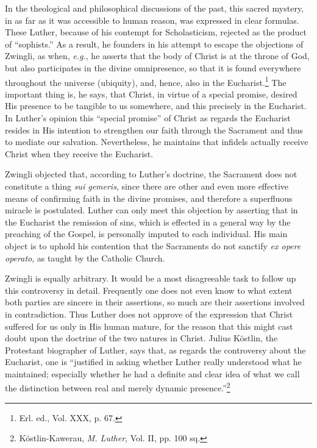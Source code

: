 In the theological and philosophical discussions of the past, this
sacred mystery, in as far as it was accessible to human reason, was
expressed in clear formulas. These Luther, because of his contempt for
Scholasticism, rejected as the product of “sophists.” As a result, he
founders in his attempt to escape the objections of Zwingli, as when,
\textit{e.g.}, he asserts that the body of Christ is at the throne of God, but
also participates in the divine omnipresence, so that it is found everywhere
throughout the universe (ubiquity), and, hence, also in the
Eucharist.\footnote{Erl. ed., Vol. XXX, p. 67.}
The important thing is, he says, that Christ, in virtue of a
special promise, desired His presence to be tangible to us somewhere,
and this precisely in the Eucharist. In Luther’s opinion this “special
promise” of Christ as regards the Eucharist resides in His intention
to strengthen our faith through the Sacrament and thus to mediate
our salvation. Nevertheless, he maintains that infidels actually receive
Christ when they receive the Eucharist.

Zwingli objected that, according to Luther’s doctrine, the Sacrament does
not constitute a thing \textit{sui gemeris}, since there are other
and even more effective means of confirming faith in the divine
promises, and therefore a superfluous miracle is postulated. Luther
can only meet this objection by asserting that in the Eucharist the
remission of sins, which is effected in a general way by the preaching
of the Gospel, is personally imputed to each individual. His main
object is to uphold his contention that the Sacraments do not
sanctify \textit{ex opere operato}, as taught by the Catholic Church.

Zwingli is equally arbitrary. It would be a most disagreeable task
to follow up this controversy in detail. Frequently one does not
even know to what extent both parties are sincere in their assertions,
so much are their assertions involved in contradiction. Thus
Luther does not approve of the expression that Christ suffered for
us only in His human mature, for the reason that this might cast
doubt upon the doctrine of the two natures in Christ. Julius
Köstlin, the Protestant biographer of Luther, says that, as regards
the controversy about the Eucharist, one is “justified in asking
whether Luther really understood what he maintained; especially
whether he had a definite and clear idea of what we call the distinction
between real and merely dynamic presence.”\footnote{Köstlin-Kawerau, \textit{M. Luther}, Vol. II, pp. 100 sq.}

